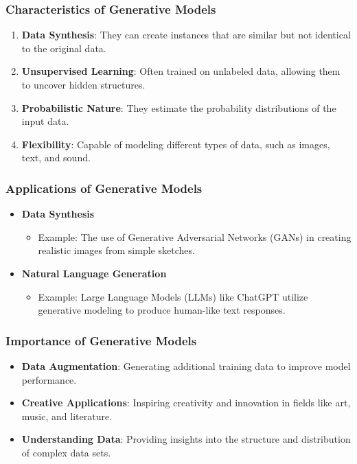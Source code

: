 \documentclass[aspectratio=169]{beamer}
\begin{document}
\begin{frame}[fragile]
    \frametitle{Characteristics of Generative Models}
    \begin{enumerate}
        \item \textbf{Data Synthesis}: They can create instances that are similar but not identical to the original data.
        \item \textbf{Unsupervised Learning}: Often trained on unlabeled data, allowing them to uncover hidden structures.
        \item \textbf{Probabilistic Nature}: They estimate the probability distributions of the input data.
        \item \textbf{Flexibility}: Capable of modeling different types of data, such as images, text, and sound.
    \end{enumerate}
\end{frame}

\begin{frame}[fragile]
    \frametitle{Applications of Generative Models}
    \begin{itemize}
        \item \textbf{Data Synthesis}
            \begin{itemize}
                \item Example: The use of Generative Adversarial Networks (GANs) in creating realistic images from simple sketches.
            \end{itemize}
        
        \item \textbf{Natural Language Generation}
            \begin{itemize}
                \item Example: Large Language Models (LLMs) like ChatGPT utilize generative modeling to produce human-like text responses.
            \end{itemize}
    \end{itemize}
\end{frame}

\begin{frame}[fragile]
    \frametitle{Importance of Generative Models}
    \begin{itemize}
        \item \textbf{Data Augmentation}: Generating additional training data to improve model performance.
        \item \textbf{Creative Applications}: Inspiring creativity and innovation in fields like art, music, and literature.
        \item \textbf{Understanding Data}: Providing insights into the structure and distribution of complex data sets.
    \end{itemize}
\end{frame}
\end{document}

